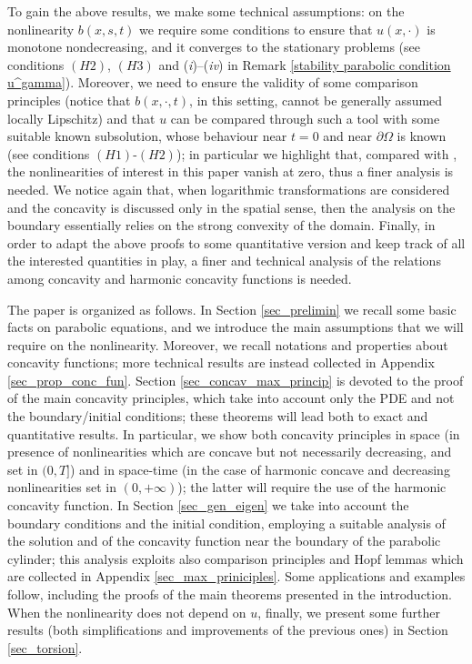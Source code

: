 \documentclass[11pt, reqno]{amsart}
\theoremstyle{definition}
\numberwithin{equation}{section}
\begin{document}
To gain the above results, we make some technical assumptions: on the nonlinearity $b(x,s,t)$ we require some conditions to ensure that $u(x, \cdot)$ is monotone nondecreasing, and it converges to the stationary problems (see conditions \hyperlink{H2}{\( (H2) \)}, \hyperlink{H3}{\( (H3) \)} and (\textit{i})--(\textit{iv}) in Remark \ref{stability parabolic condition u^gamma}). 
Moreover, we need to ensure the validity of some comparison principles (notice that $b(x,\cdot,t)$, in this setting, cannot be generally assumed locally Lipschitz) and that $u$ can be compared through such a tool with some suitable known subsolution, whose behaviour near $t=0$ and near $\partial \Omega$ is known (see conditions \hyperlink{H1}{\( (H1) \)}-\hyperlink{H2}{\( (H2) \)}); in particular we highlight that, compared with \cite{kenningtonparabolic}, the nonlinearities of interest in this paper vanish at zero, thus a finer analysis is needed. 
We notice again that, when logarithmic transformations are considered and the concavity is discussed only in the spatial sense, then the analysis on the boundary essentially relies on the strong convexity of the domain. 
Finally, in order to adapt the above proofs to some quantitative version and keep track of all the interested quantities in play, a finer and technical analysis of the relations among concavity and harmonic concavity functions is needed.

\medskip

The paper is organized as follows. 
In Section \ref{sec_prelimin} we recall some basic facts on parabolic equations, and we introduce the main assumptions that we will require on the nonlinearity. 
Moreover, we recall notations and properties about concavity functions; more technical results are instead collected in Appendix \ref{sec_prop_conc_fun}.
Section \ref{sec_concav_max_princip} is devoted to the proof of the main concavity principles, which take into account only the PDE and not the boundary/initial conditions; these theorems will lead both to exact and quantitative results. 
In particular, we show both concavity principles in space (in presence of nonlinearities which are concave but not necessarily decreasing, and set in $(0,T]$) and in space-time (in the case of harmonic concave and decreasing nonlinearities set in $(0,+\infty)$); the latter will require the use of the harmonic concavity function.
In Section \ref{sec_gen_eigen} we take into account the boundary conditions and the initial condition, employing a suitable analysis of the solution and of the concavity function near the boundary of the parabolic cylinder; this analysis exploits also comparison principles and Hopf lemmas which are collected in Appendix \ref{sec_max_priniciples}. Some applications and examples follow, including the proofs of the main theorems presented in the introduction.
When the nonlinearity does not depend on $u$, finally, we present some further results (both simplifications and improvements of the previous ones) in Section \ref{sec_torsion}.
\end{document}
